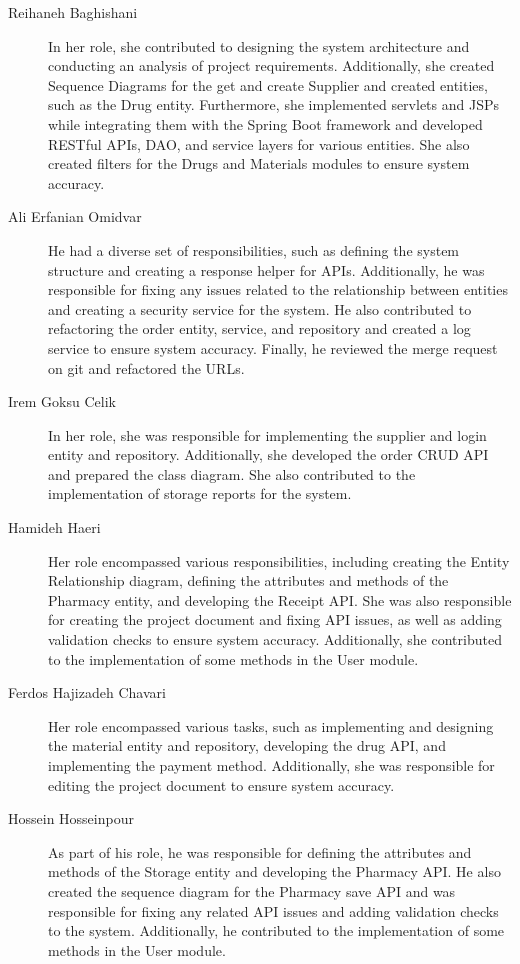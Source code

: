 \begin{description}
	\item[Reihaneh Baghishani] In her role, she contributed to designing the system architecture and conducting an analysis of project requirements. Additionally, she created Sequence Diagrams for the get and create Supplier and created entities, such as the Drug entity. Furthermore, she implemented servlets and JSPs while integrating them with the Spring Boot framework and developed RESTful APIs, DAO, and service layers for various entities. She also created filters for the Drugs and Materials modules to ensure system accuracy.
 
	\item[Ali Erfanian Omidvar] He had a diverse set of responsibilities, such as defining the system structure and creating a response helper for APIs. Additionally, he was responsible for fixing any issues related to the relationship between entities and creating a security service for the system. He also contributed to refactoring the order entity, service, and repository and created a log service to ensure system accuracy. Finally, he reviewed the merge request on git and refactored the URLs.
 
	\item[Irem Goksu Celik] In her role, she was responsible for implementing the supplier and login entity and repository. Additionally, she developed the order CRUD API and prepared the class diagram. She also contributed to the implementation of storage reports for the system.
 
	\item[Hamideh Haeri] Her role encompassed various responsibilities, including creating the Entity Relationship diagram, defining the attributes and methods of the Pharmacy entity, and developing the Receipt API. She was also responsible for creating the project document and fixing API issues, as well as adding validation checks to ensure system accuracy. Additionally, she contributed to the implementation of some methods in the User module.
 
	\item[Ferdos Hajizadeh Chavari] Her role encompassed various tasks, such as implementing and designing the material entity and repository, developing the drug API, and implementing the payment method. Additionally, she was responsible for editing the project document to ensure system accuracy.
 
	\item[Hossein Hosseinpour] As part of his role, he was responsible for defining the attributes and methods of the Storage entity and developing the Pharmacy API. He also created the sequence diagram for the Pharmacy save API and was responsible for fixing any related API issues and adding validation checks to the system. Additionally, he contributed to the implementation of some methods in the User module.


\end{description}
